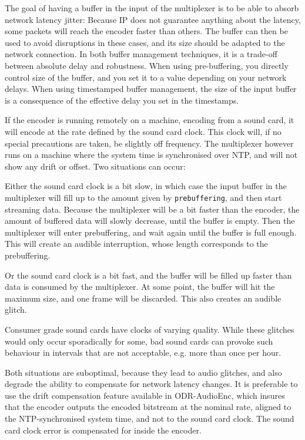 The goal of having a buffer in the input of the multiplexer is to be able to
absorb network latency jitter: Because IP does not guarantee anything about the
latency, some packets will reach the encoder faster than others. The buffer can
then be used to avoid disruptions in these cases, and its size should be
adapted to the network connection.
In both buffer management techniques, it is a trade-off between absolute delay
and robustness. When using pre-buffering, you directly control size of the
buffer, and you set it to a value depending on your network delays. When using
timestamped buffer management, the size of the input buffer is a consequence of
the effective delay you set in the timestamps.

If the encoder is running remotely on a machine, encoding from a sound card, it
will encode at the rate defined by the sound card clock. This clock will, if no
special precautions are taken, be slightly off frequency. The multiplexer
however runs on a machine where the system time is synchronised over NTP, and
will not show any drift or offset. Two situations can occur:

Either the sound card clock is a bit slow, in which case the input buffer in
the multiplexer will fill up to the amount given by \texttt{prebuffering},
and then start streaming data. Because the multiplexer will be a bit faster
than the encoder, the amount of buffered data will slowly decrease, until the
buffer is empty. Then the multiplexer will enter prebuffering, and wait again
until the buffer is full enough. This will create an audible interruption,
whose length corresponds to the prebuffering.

Or the sound card clock is a bit fast, and the buffer will be filled up faster
than data is consumed by the multiplexer. At some point, the buffer will hit
the maximum size, and one frame will be discarded. This also creates an
audible glitch.

Consumer grade sound cards have clocks of varying quality. While these glitches
would only occur sporadically for some, bad sound cards can provoke such
behaviour in intervals that are not acceptable, e.g. more than once per hour.

Both situations are suboptimal, because they lead to audio glitches, and also
degrade the ability to compensate for network latency changes. It is preferable
to use the drift compensation feature available in ODR-AudioEnc, which
insures that the encoder outputs the encoded bitstream at the nominal rate, aligned
to the NTP-synchronised system time, and not to the sound card clock. The sound
card clock error is compensated for inside the encoder.

